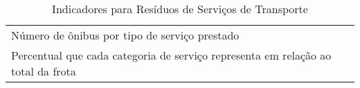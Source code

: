 \begin{table}[h!]
  \centering
  \caption{Indicadores para Resíduos de Serviços de Transporte}
    \begin{tabular}{|p{25em}|}
    \rowcolor[rgb]{ .984,  .831,  .706} \multicolumn{1}{P{25em}}{RESÍDUOS DE SERVIÇOS DE TRANSPORTE} \\
    \midrule
    Número de ônibus por tipo de serviço prestado \\
    \midrule
    Percentual que cada categoria de serviço representa em relação ao total da frota \\
    \bottomrule
    \end{tabular}%
  \label{tab:ind_rst}%
\end{table}%
